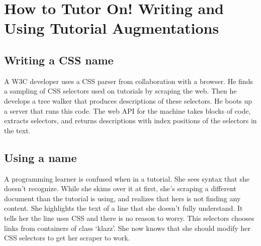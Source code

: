 \section{How to Tutor On!  Writing and Using Tutorial Augmentations}

\subsection{Writing a CSS \gls{name}}

A W3C developer uses a CSS parser from collaboration with a browser.
He finds a sampling of CSS selectors used on tutorials by scraping the web.
Then he develops a tree walker that produces descriptions of these selectors.
He boots up a server that runs this code.
The web API for the machine takes blocks of code, extracts selectors, and returns descriptions with index positions of the selectors in the text.

\subsection{Using a \gls{name}}

A programming learner is confused when in a tutorial.
She sees syntax that she doesn't recognize.
While she skims over it at first, she's scraping a different document than the tutorial is using, and realizes that hers is not finding any content.
She highlights the text of a line that she doesn't fully understand.
It tells her the line uses CSS and there is no reason to worry.
This selectors chooses links from containers of class `klazz'.
She now knows that she should modify her CSS selectors to get her scraper to work.
